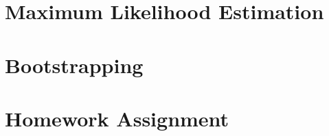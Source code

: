 




\section[MLE]{Maximum Likelihood Estimation}
\frame{\tableofcontents[currentsection]}



	



\section[Bootstrap]{Bootstrapping}
\frame{\tableofcontents[currentsection]}





\section[HW]{Homework Assignment}
\frame{\tableofcontents[currentsection]}





\appendix
\frame{}


